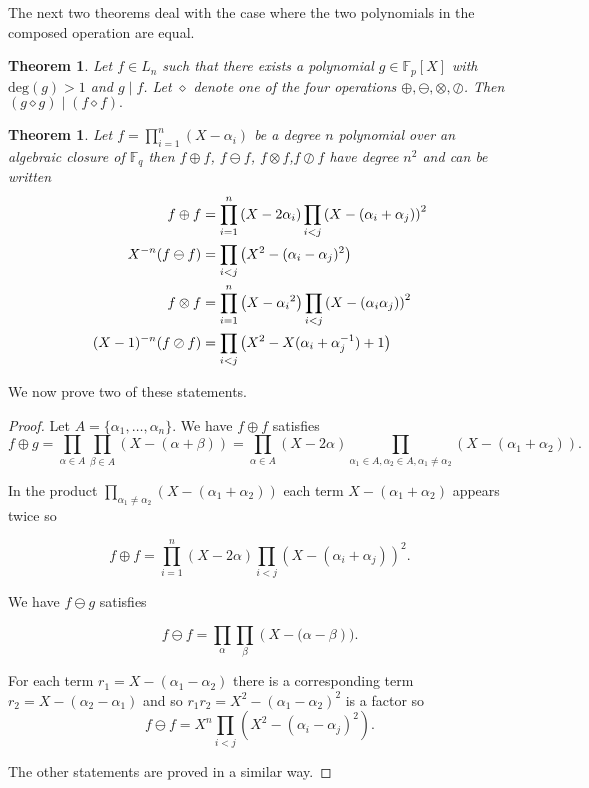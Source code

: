 \documentclass{article}
\let\originalleft\left
\let\originalright\right
\renewcommand{\left}{\mathopen{}\mathclose\bgroup\originalleft}
\renewcommand{\right}{\aftergroup\egroup\originalright}
\newcounter{dummy} \numberwithin{dummy}{section}
\theoremstyle{plain}
\newtheorem{thm}[dummy]{Theorem}
\theoremstyle{definition}
\def\Fp {{ \mathbb{F} _ {p} }}
\def\Fq {{ \mathbb{F} _ {q} }}
\def\deg {{ \mathrm{deg}}}
\begin{document}
		The next two theorems deal with the case where the two polynomials in the composed operation are equal. 
		
		\begin{thm}
		\label{THM:facrules}
		    Let $f \in L_n$ such that there exists a polynomial $g \in \Fp[X]$ with $\deg(g)>1$ and $g \mid f$. Let $\diamond$ denote one of the four operations $\oplus,\ominus,\otimes,\oslash$. Then $(g \diamond g) \mid (f \diamond f).$  
		\end{thm}
		
		\begin{thm}
		\label{THM:SumFactor}
		    Let $f=\prod_{i=1}^n{(X-\alpha_i)}$ be a degree $n$ polynomial over an algebraic closure of $\Fq$ then $f \oplus f$, $f \ominus f$, $f \otimes f$,$f \oslash f$ have degree $n^2$ and can be written
				\begin{alignat*}{2}
		    f \oplus  f               &= \prod_{i=1}^n{\left(X-2\alpha_i\right)}\prod_{i<j}{\left(X-(\alpha_i+\alpha_j)\right)}^2    \\ 
				X^{-n}( f \ominus f )     &= \prod_{i<j}{\left(X^2-(\alpha_i-\alpha_j)^2 \right)}                              \\	
				f \otimes f               &= \prod_{i=1}^n{\left(X-{\alpha_i}^2 \right)}\prod_{i<j}{\left(X-(\alpha_i\alpha_j) \right)}^2  \\
				(X-1)^{-n}( f \oslash f ) &= \prod_{i<j}{\left( X^2-X(\alpha_i + \alpha_j^{-1})+1 \right)}         
				\end{alignat*}
		\end{thm}
		
		We now prove two of these statements.
		
		\begin{proof}
		   Let $A=\{\alpha_1,\ldots,\alpha_n \}$. We have $f \oplus f$ satisfies
		    \[ f \oplus g = \prod_{\alpha \in A}{\prod_{\beta \in A}({X-(\alpha+\beta)})} 
						= \prod_{\alpha \in A}{(X-2\alpha)} \prod_{\alpha_1 \in A, \alpha_2 \in A, \alpha_1 \not= \alpha_2}{(X-(\alpha_1+\alpha_2))}. \]
						
				In the product $\prod_{\alpha_1 \not= \alpha_2}{(X-(\alpha_1+\alpha_2))}$ each term $X-(\alpha_1+\alpha_2)$ appears twice so 
				
				\[ f \oplus f =\prod_{i=1}^n{(X-2\alpha)}\prod_{i<j}{(X-(\alpha_i+\alpha_j))}^2. \] 
				
				We have $f \ominus g$ satisfies 
				
			  \[f \ominus f = \prod_{\alpha}{\prod_{\beta}({X-(\alpha-\beta}))}. \]
						
				For each term $r_1= X-(\alpha_1-\alpha_2)$ there is a corresponding term $r_2=X-(\alpha_2-\alpha_1)$ and so $r_1r_2=X^2-(\alpha_1-\alpha_2)^2$ is a factor so 			
				\[ f \ominus f = X^n\prod_{i<j}{(X^2-(\alpha_i-\alpha_j)^2)} . 	\]		
				
				The other statements are proved in a similar way.
		\end{proof}
		
\end{document}

